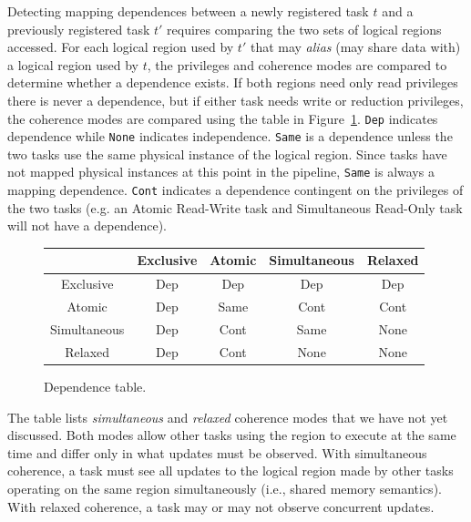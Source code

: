 Detecting mapping dependences between a newly registered task $t$ and
a previously registered task $t'$ requires comparing the two sets of
logical regions accessed.  For each logical region used by $t'$ that
may {\em alias} (may share data with) a logical region used by $t$, the privileges and
coherence modes are compared to determine whether a dependence exists.
If both regions need only read privileges there is never a dependence,
but if either task needs write or reduction privileges, the coherence
modes are compared using the table in Figure~\ref{fig:dependence}.
{\tt Dep} indicates dependence while {\tt None}
indicates independence.  {\tt Same} is a dependence unless the two tasks
use the same physical instance of the logical region.  Since tasks
have not mapped physical instances at this point in the pipeline,
{\tt Same} is always a mapping dependence.
{\tt Cont} 
indicates a dependence contingent on the privileges of the two tasks
(e.g. an Atomic Read-Write task and Simultaneous Read-Only task will not have a dependence).


\begin{figure}
{\small
\begin{tabular}{c|cccc}
             & Exclusive & Atomic   & Simultaneous & Relaxed \\
\midrule
Exclusive    & Dep & Dep & Dep & Dep \\ 
Atomic       & Dep & Same & Cont & Cont \\
Simultaneous & Dep & Cont & Same & None \\
Relaxed      & Dep & Cont & None & None \\
\end{tabular}
}
\vspace{-2mm}
\caption{Dependence table. \label{fig:dependence}}
\vspace{-6mm}
\end{figure}

The table lists {\em simultaneous} and {\em relaxed} coherence modes
that we have not yet discussed.  Both modes
allow other tasks using the region to execute at the same time and differ
only in what updates must be observed.  With simultaneous coherence, a task must 
see all updates to the logical region made by other tasks operating on the same region 
simultaneously (i.e., shared memory semantics).  With relaxed coherence, 
a task may or may not observe concurrent updates.


